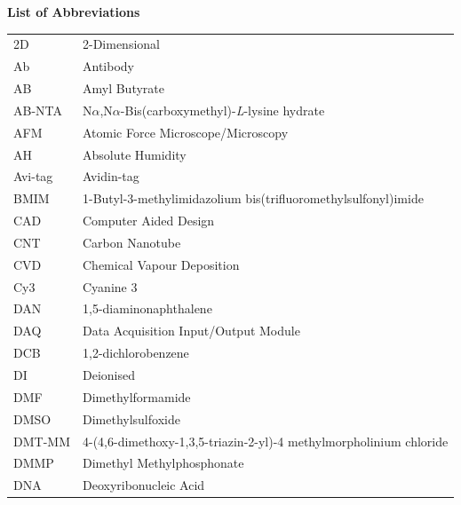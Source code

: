 \documentclass[
  a4paper,
]{scrbook}
\begin{document}

\thispagestyle{plain}

\begin{flushleft}
\huge\textbf{List of Abbreviations}
\end{flushleft}

\vspace*{\baselineskip}

\begin{table}[H]
  \begin{tabular}{@{}p{} p{}@{}}  %
    2D  & 2-Dimensional  \\[5pt]
    Ab  & Antibody  \\[5pt]
    AB  & Amyl Butyrate  \\[5pt]
    AB-NTA  & N$\alpha$,N$\alpha$-Bis(carboxymethyl)-\textit{L}-lysine hydrate  \\[5pt]
    AFM  & Atomic Force Microscope/Microscopy  \\[5pt]
    AH  & Absolute Humidity  \\[5pt]
    Avi-tag  & Avidin-tag  \\[5pt]
    BMIM  & 1-Butyl-3-methylimidazolium bis(trifluoromethylsulfonyl)imide  \\[5pt]
    CAD  & Computer Aided Design \\[5pt]
    CNT  & Carbon Nanotube  \\[5pt]
    CVD  & Chemical Vapour Deposition  \\[5pt]
    Cy3  & Cyanine 3  \\[5pt]
    DAN  & 1,5-diaminonaphthalene  \\[5pt]
    DAQ  & Data Acquisition Input/Output Module  \\[5pt]
    DCB  & 1,2-dichlorobenzene  \\[5pt]
    DI  & Deionised  \\[5pt]
    DMF  & Dimethylformamide   \\[5pt]
    DMSO  & Dimethylsulfoxide   \\[5pt]
    DMT-MM   & 4-(4,6-dimethoxy-1,3,5-triazin-2-yl)-4 methylmorpholinium chloride \\[5pt]
    DMMP  & Dimethyl Methylphosphonate  \\[5pt]
    DNA  & Deoxyribonucleic Acid  \\[5pt]

\end{tabular}
\end{table}
\end{document}
